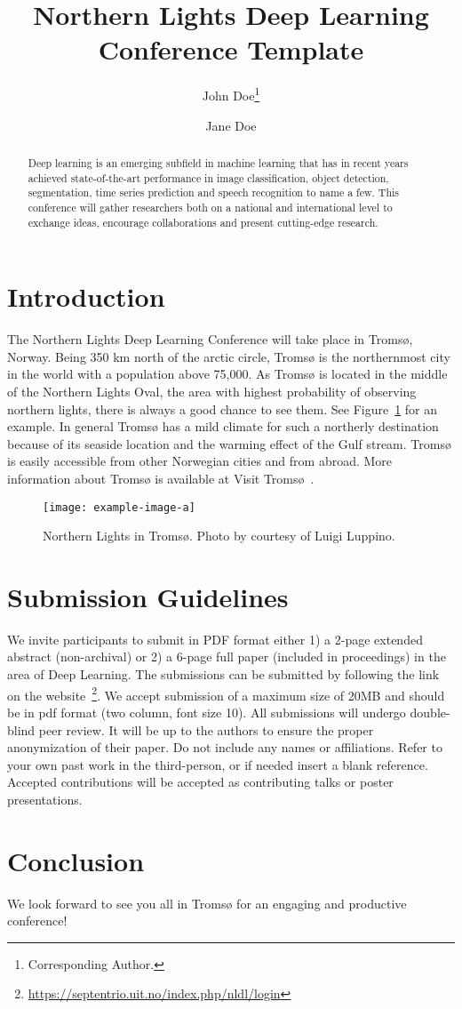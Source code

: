\documentclass[fullpaper]{nldl}
\title{Northern Lights Deep Learning Conference Template}
\author[1]{John Doe\thanks{Corresponding Author.}}
\author[1,2]{Jane Doe}
\affil[1]{Affiliation 1}
\affil[2]{Affiliation 2}
\affil[ ]{\texttt{\{john.doe, jane.doe\}@affiliation.com}}
\begin{document}
\maketitle

\begin{abstract}
Deep learning is an emerging subfield in machine learning that has in recent years achieved state-of-the-art performance in image classification, object detection, segmentation, time series prediction and speech recognition to name a few. This conference will gather researchers both on a national and international level to exchange ideas, encourage collaborations and present cutting-edge research.
\end{abstract}

\section{Introduction}
The Northern Lights Deep Learning Conference will take place in Troms{\o}, Norway. Being 350 km north of the arctic circle, Troms{\o} is the northernmost city in the world with a population above 75,000. As Troms{\o} is located in the middle of the Northern Lights Oval, the area with highest probability of observing northern lights, there is always a good chance to see them. See Figure~\ref{fig:northernlights} for an example. In general Troms{\o} has a mild climate for such a northerly destination because of its seaside location and the warming effect of the Gulf stream. Troms{\o} is easily accessible from other Norwegian cities and from abroad. More information about Troms{\o} is available at Visit Troms{\o}~\cite{tromso}.

\begin{figure}[htbp]
    \centering
    \texttt{[image: example-image-a]}
    \caption{Northern Lights in Troms{\o}. Photo by courtesy of Luigi Luppino.}
    \label{fig:northernlights}
\end{figure}

\section{Submission Guidelines}
We invite participants to submit in PDF format either 1) a 2-page extended abstract (non-archival) or 2) a 6-page full paper (included in proceedings) in the area of Deep Learning.
The submissions can be submitted by following the link on the website~\footnote{\url{https://septentrio.uit.no/index.php/nldl/login}}. We accept submission of a maximum size of 20MB and should be in pdf format (two column, font size 10). All submissions will undergo double-blind peer review. It will be up to the authors to ensure the proper anonymization of their paper. Do not include any names or affiliations. Refer to your own past work in the third-person, or if needed insert a blank reference. Accepted contributions will be accepted as contributing talks or poster presentations.

\section{Conclusion}
We look forward to see you all in Troms{\o} for an engaging and productive conference!


\printbibliography
\end{document}
